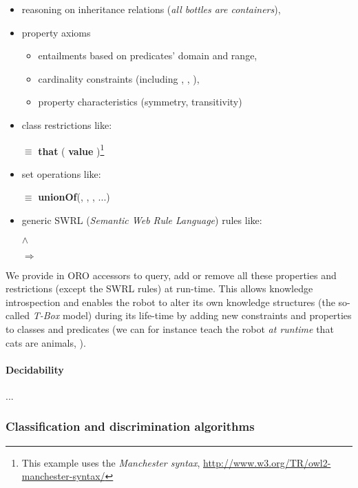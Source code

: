 \begin{itemize}
	\item reasoning on inheritance relations (\eg \emph{all bottles are containers}),
	\item property axioms
		\begin{itemize}
		\item entailments based on predicates' domain and range,
		\item cardinality constraints (including , 
		, ),
		\item property characteristics (symmetry, transitivity)
		\end{itemize}
	\item class restrictions like: \par \footnotesize {} $\equiv$
		 {\bf that} ( {\bf value}
		)\footnote{This example uses the \emph{Manchester
		syntax}, \url{http://www.w3.org/TR/owl2-manchester-syntax/}} \normalsize
	\item set operations like: \par \footnotesize {} $\equiv$ {\bf unionOf}(,
		, , ...) \normalsize
	\item generic SWRL ({\em Semantic Web Rule Language}) rules like: \par
		\footnotesize {} $\land$
		 \par $\Rightarrow$ 
		\normalsize 
	\end{itemize}

We provide in ORO accessors to query, add or remove all these properties and
restrictions (except the SWRL rules) at run-time. This allows knowledge
introspection and enables the robot to alter its own knowledge structures (the
so-called \emph{T-Box} model) during its life-time by adding new constraints
and properties to classes and predicates (we can for instance teach the robot
\emph{at runtime} that cats are animals, \ie {}).



\paragraph{Decidability}

...

\subsubsection{Classification and discrimination algorithms}
\label{sect|discrimination}

